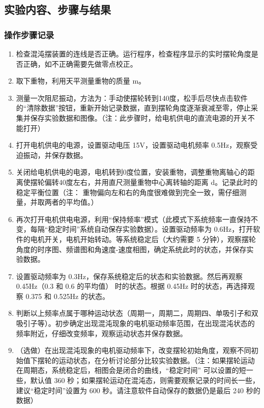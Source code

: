 \documentclass[dvipsnames, svgnames,a4paper,11pt]{article}
\begin{document}
	\subsection{实验内容、步骤与结果}
	\subsubsection{操作步骤记录}
	\begin{enumerate}
		\item 检查混沌摆装置的连线是否正确。运行程序，检查程序显示的实时摆轮角度是否正确，如不正确需要先做零点校正。
		\item 取下重物，利用天平测量重物的质量 m。
		\item 测量一次阻尼振动，方法为：手动使摆轮转到140度，松手后尽快点击软件的“清除数据”按钮，重新开始记录数据，直到摆轮角度逐渐衰减至零，停止采集并保存实验数据和图像。（注：此步骤时，给电机供电的直流电源的开关不能打开）
		\item 打开电机供电的电源，设置驱动电压 15V，设置驱动电机频率 0.5Hz，观察受迫振动，并保存数据。
		\item 关闭给电机供电的电源，电机转到0度位置，安装重物，调整重物离轴心的距离使摆轮偏转40度左右，并用直尺测量重物中心离转轴的距离 d。记录此时的稳定平衡位置（注： 重物偏向左和右的角度很难做到完全一致，需仔细测量，并取两者的平均值。）
		\item 再次打开电机供电电源，利用“保持频率”模式（此模式下系统频率一直保持不变，每隔“稳定时间”系统自动保存实验数据）。设置驱动频率为 0.6Hz，打开软件的电机开关，电机开始转动。等系统稳定后（大约需要 5 分钟），观察摆轮角度的时序图、频谱图和角速度-速度相图，确定系统此时的状态，并保存实验数据。 
		\item 设置驱动频率为 0.3Hz，保存系统稳定后的状态和实验数据。然后再观察 0.45Hz（0.3 和 0.6 的平均值） 时的状态。根据 0.45Hz 时的状态，再选择观察 0.375 和 0.525Hz 的状态。
		\item 判断以上频率点属于哪种运动状态（周期一，周期二，周期四、单吸引子和双吸引子等）。初步确定出现混沌现象的电机驱动频率范围，在出现混沌状态的频率附近，仔细改变频率，观察运动状态并保存数据。 
		\item （选做）在出现混沌现象的电机驱动频率下，改变摆轮初始角度，观察不同初始值下摆轮的运动状态，在分析讨论部分比较实验数据。（注：如果摆轮运动在周期态，系统稳定后，相图会是闭合的曲线，“稳定时间” 可以设置的短一些，默认值 360 秒；如果摆轮运动在混沌态，则需要观察记录的时间长一些，建议“稳定时间”设置为 600 秒。请注意软件自动保存的数据仍是最后 240 秒的数据）
	\end{enumerate}	
	
\end{document}
